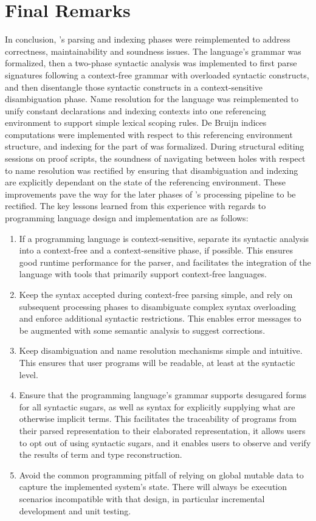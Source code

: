 \section{Final Remarks}

In conclusion, \Beluga's parsing and indexing phases were reimplemented to address correctness, maintainability and soundness issues.
The language's grammar was formalized, then a two-phase syntactic analysis was implemented to first parse \Beluga signatures following a context-free grammar with overloaded syntactic constructs, and then disentangle those syntactic constructs in a context-sensitive disambiguation phase.
Name resolution for the language was reimplemented to unify constant declarations and indexing contexts into one referencing environment to support simple lexical scoping rules.
De Bruijn indices computations were implemented with respect to this referencing environment structure, and indexing for the \LF part of \Beluga was formalized.
During \Harpoon structural editing sessions on proof scripts, the soundness of navigating between holes with respect to name resolution was rectified by ensuring that disambiguation and indexing are explicitly dependant on the state of the referencing environment.
These improvements pave the way for the later phases of \Beluga's processing pipeline to be rectified.
The key lessons learned from this experience with regards to programming language design and implementation are as follows:

\begin{enumerate}
\item
If a programming language is context-sensitive, separate its syntactic analysis into a context-free and a context-sensitive phase, if possible.
This ensures good runtime performance for the parser, and facilitates the integration of the language with tools that primarily support context-free languages.
\item
Keep the syntax accepted during context-free parsing simple, and rely on subsequent processing phases to disambiguate complex syntax overloading and enforce additional syntactic restrictions.
This enables error messages to be augmented with some semantic analysis to suggest corrections.
\item
Keep disambiguation and name resolution mechanisms simple and intuitive.
This ensures that user programs will be readable, at least at the syntactic level.
\item
Ensure that the programming language's grammar supports desugared forms for all syntactic sugars, as well as syntax for explicitly supplying what are otherwise implicit terms.
This facilitates the traceability of programs from their parsed representation to their elaborated representation, it allows users to opt out of using syntactic sugars, and it enables users to observe and verify the results of term and type reconstruction.
\item
Avoid the common programming pitfall of relying on global mutable data to capture the implemented system's state.
There will always be execution scenarios incompatible with that design, in particular incremental development and unit testing.
\end{enumerate}
